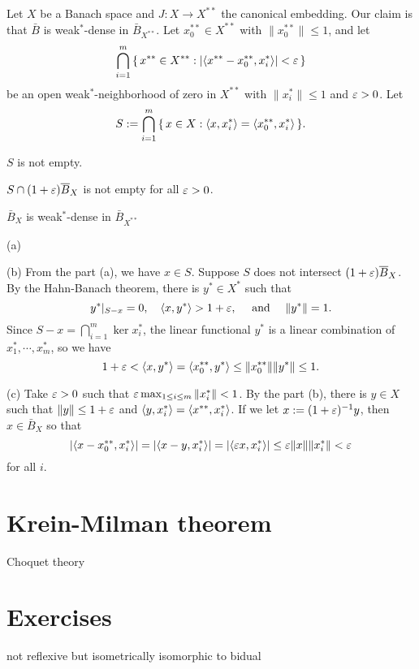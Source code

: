 \documentclass{../note}
\begin{document}
\begin{prb}
Let $X$ be a Banach space and $J:X\to X^{**}$ the canonical embedding.
Our claim is that $\bar B$ is weak$^*$-dense in $\bar B_{X^{**}}$.
Let $x_0^{**}\in X^{**}$ with $\|x_0^{**}\|\le1$, and let
\[\bigcap_{i=1}^m\,\{\,x^{**}\in X^{**}:|\langle x^{**}-x_0^{**},x_i^*\rangle|<\varepsilon\,\}\]
be an open weak$^*$-neighborhood of zero in $X^{**}$ with $\|x_i^*\|\le1$ and $\varepsilon>0$.
Let
\[S:=\bigcap_{i=1}^m\,\{\,x\in X:\langle x,x_i^*\rangle=\langle x_0^{**},x_i^*\rangle\,\}.\]
\begin{parts}
\item $S$ is not empty.
\item $S\cap(1+\varepsilon)\overline B_X$ is not empty for all $\varepsilon>0$.
\item $\bar B_X$ is weak$^*$-dense in $\bar B_{X^{**}}$
\end{parts}
\end{prb}
\begin{pf}
(a)

(b)
From the part (a), we have $x\in S$.
Suppose $S$ does not intersect $(1+\varepsilon)\overline B_X$.
By the Hahn-Banach theorem, there is $y^*\in X^*$ such that
\[y^*|_{S-x}=0,\quad\langle x,y^*\rangle>1+\varepsilon,\quad\text{ and }\quad\|y^*\|=1.\]
Since $S-x=\bigcap_{i=1}^m\ker x_i^*$, the linear functional $y^*$ is a linear combination of $x_1^*,\cdots,x_m^*$, so we have
\[1+\varepsilon<\langle x,y^*\rangle=\langle x_0^{**},y^*\rangle\le\|x_0^{**}\|\|y^*\|\le1.\]

(c)
Take $\varepsilon>0$ such that $\varepsilon\max_{1\le i\le m}\|x_i^*\|<1$.
By the part (b), there is $y\in X$ such that $\|y\|\le1+\varepsilon$ and $\langle y,x_i^*\rangle=\langle x^{**},x_i^*\rangle$.
If we let $x:=(1+\varepsilon)^{-1}y$, then $x\in\bar B_X$ so that
\[|\langle x-x_0^{**},x_i^*\rangle|=|\langle x-y,x_i^*\rangle|=|\langle\varepsilon x,x_i^*\rangle|\le\varepsilon\|x\|\|x_i^*\|<\varepsilon\]
for all $i$.
\end{pf}




\section{Krein-Milman theorem}
Choquet theory



\section*{Exercises}
\begin{prb}
not reflexive but isometrically isomorphic to bidual
\end{prb}
\end{document}
